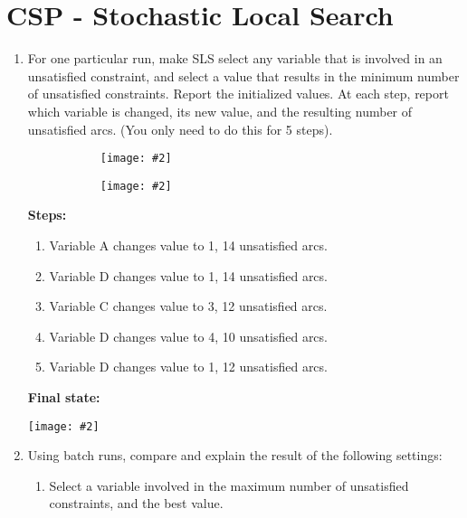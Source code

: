 \documentclass{article}
\def\ans#1{{\color{ans}#1}}
\newcommand{\centerfig}[2]{\begin{center}\texttt{[image: \#2]}\end{center}}
\begin{document}
\section{CSP - Stochastic Local Search}
\begin{enumerate}[label=(\alph*)]
    \item For one particular run, make SLS select any variable that is involved in an unsatisfied constraint, and select a value that results in the minimum number of unsatisfied constraints. Report the initialized values.  At each step, report which variable is changed, its new value, and the resulting number of unsatisfied arcs. (You only need to do this for 5 steps).
    \ans{
        \begin{center}
            \begin{figure}[htp]
            \begin{subfigure}[b]{0.5\textwidth} \color{ans}
                \centerfig{1}{../figs/q4_a_1.png}
            \end{subfigure}
            \begin{subfigure}[b]{0.5\textwidth} \color{ans}
                \centerfig{1}{../figs/q4_a_2.png}
            \end{subfigure}
            \end{figure}
        \end{center}
        \textbf{Steps:}
        \begin{enumerate}[label=(\arabic*)]
            \item Variable A changes value to 1, 14 unsatisfied arcs.
            \item Variable D changes value to 1, 14 unsatisfied arcs.
            \item Variable C changes value to 3, 12 unsatisfied arcs.
            \item Variable D changes value to 4, 10 unsatisfied arcs.
            \item Variable D changes value to 1, 12 unsatisfied arcs.
        \end{enumerate}
        \textbf{Final state:}
        \centerfig{0.8}{../figs/q4_a_3.png}
    }
    \clearpage
    \item Using batch runs, compare and explain the result of the following settings:
    \begin{enumerate}[label=(\roman*)]
        \item Select a variable involved in the maximum number of unsatisfied constraints, and the best value.\\

\end{enumerate}
\end{enumerate}
\end{document}
